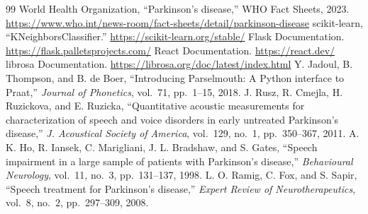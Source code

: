 \documentclass[oneside,a4paper,12pt]{report}
\begin{document}
\begin{thebibliography}{99}
 World Health Organization, ``Parkinson's disease,'' WHO Fact Sheets, 2023. \url{https://www.who.int/news-room/fact-sheets/detail/parkinson-disease}
 scikit-learn, ``KNeighborsClassifier.'' \url{https://scikit-learn.org/stable/}
 Flask Documentation. \url{https://flask.palletsprojects.com/}
 React Documentation. \url{https://react.dev/}
 librosa Documentation. \url{https://librosa.org/doc/latest/index.html}
 Y. Jadoul, B. Thompson, and B. de Boer, ``Introducing Parselmouth: A Python interface to Praat,'' \textit{Journal of Phonetics}, vol.\ 71, pp.\ 1--15, 2018.
 J. Rusz, R. Cmejla, H. Ruzickova, and E. Ruzicka, ``Quantitative acoustic measurements for characterization of speech and voice disorders in early untreated Parkinson's disease,'' \textit{J. Acoustical Society of America}, vol.\ 129, no.\ 1, pp.\ 350--367, 2011.
 A. K. Ho, R. Iansek, C. Marigliani, J. L. Bradshaw, and S. Gates, ``Speech impairment in a large sample of patients with Parkinson's disease,'' \textit{Behavioural Neurology}, vol.\ 11, no.\ 3, pp.\ 131--137, 1998.
 L. O. Ramig, C. Fox, and S. Sapir, ``Speech treatment for Parkinson's disease,'' \textit{Expert Review of Neurotherapeutics}, vol.\ 8, no.\ 2, pp.\ 297--309, 2008.
\end{thebibliography}
\end{document}
